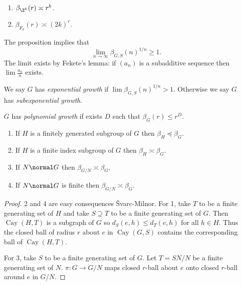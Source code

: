 \documentclass[a4paper]{article}
\DeclareMathOperator{\Cay}{Cay} %
\begin{document}
\begin{eg}\leavevmode
  \begin{enumerate}
  \item \(\beta_{\Z^k}(r) \asymp r^k\).
  \item \(\beta_{F_k}(r) \asymp (2k)^r\).
  \end{enumerate}
\end{eg}

\begin{remark}
  The proposition implies that
  \[
    \lim_{n \to \infty} \beta_{G, S}(n)^{1/n} \geq 1.
  \]
  The limit exists by Fekete's lemma: if \((a_n)\) is a subadditive sequence then \(\lim \frac{a_n}{n}\) exists.
\end{remark}

\begin{definition}
  We say \(G\) has \emph{exponential growth} if \(\lim \beta_{G, S}(n)^{1/n} > 1\). Otherwise we say \(G\) has \emph{subexponential growth}.

  \(G\) has \emph{polynomial growth} if exists \(D\) such that \(\beta_G(r) \leq r^D\).
\end{definition}

\begin{proposition}\leavevmode
  \begin{enumerate}
  \item If \(H\) is a finitely generated subgroup of \(G\) then \(\beta_H \preceq \beta_G\).
  \item If \(H\) is a finite index subgroup of \(G\) then \(\beta_H \asymp \beta_G\).
  \item If \(N \normal G\) then \(\beta_{G/N} \asymp \beta_G\).
  \item If \(N \normal G\) is finite then \(\beta_{G/N} \asymp \beta_G\).
  \end{enumerate}
\end{proposition}

\begin{proof}
  2 and 4 are easy consequences Švarc-Milnor. For 1, take \(T\) to be a finite generating set of \(H\) and take \(S \supseteq T\) to be a finite generating set of \(G\). Then \(\Cay(H, T)\) is a subgraph of \(G\) so \(d_S(e, h) \leq d_T(e, h)\) for all \(h \in H\). Thus the closed ball of radius \(r\) about \(e\) in \(\Cay(G, S)\) contains the corresponding ball of \(\Cay(H, T)\).

  For 3, take \(S\) to be a finite generating set of \(G\). Let \(T = SN/N\) be a finite generating set of \(N\). \(\pi: G \to G/N\) maps closed \(r\)-ball about \(e\) onto closed \(r\)-ball around \(e\) in \(G/N\).
\end{proof}
\end{document}
